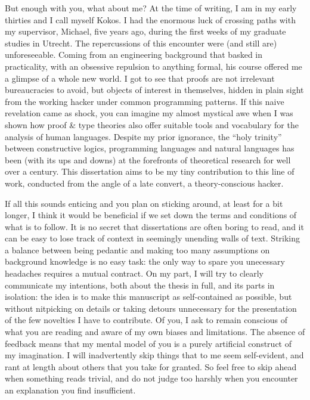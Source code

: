 {But enough with you, what about me? 
At the time of writing, I am in my early thirties and I call myself Kokos. 
I had the enormous luck of crossing paths with my supervisor, Michael, five years ago, during the first weeks of my graduate studies in Utrecht. 
The repercussions of this encounter were (and still are) unforeseeable. 
Coming from an engineering background that basked in practicality, with an obsessive repulsion to anything formal, his course offered me a glimpse of a whole new world. 
I got to see that proofs are not irrelevant bureaucracies to avoid, but objects of interest in themselves, hidden in plain sight from the working hacker under common programming patterns. 
If this naive revelation came as shock, you can imagine my almost mystical awe when I was shown how proof \& type theories also offer suitable tools and vocabulary for the analysis of human languages. 
Despite my prior ignorance, the “holy trinity” between constructive logics, programming languages and natural languages has been (with its ups and downs) at the forefronts of theoretical research for well over a century. 
This dissertation aims to be my tiny contribution to this line of work, conducted from the angle of a late convert, a theory-conscious hacker. 

If all this sounds enticing and you plan on sticking around, at least for a bit longer, I think it would be beneficial if we set down the terms and conditions of what is to follow. 
It is no secret that dissertations are often boring to read, and it can be easy to lose track of context in seemingly unending walls of text. 
Striking a balance between being pedantic and making too many assumptions on background knowledge is no easy task: the only way to spare you unecessary headaches requires a mutual contract. 
On my part, I will try to clearly communicate my intentions, both about the thesis in full, and its parts in isolation: the idea is to make this manuscript as self-contained as possible, but without nitpicking on details or taking detours unnecessary for the presentation of the few novelties I have to contribute.
Of you, I ask to remain conscious of what you are reading and aware of my own biases and limitations. 
The absence of feedback means that my mental model of you is a purely artificial construct of my imagination.
I will inadvertently skip things that to me seem self-evident, and rant at length about others that you take for granted.
So feel free to skip ahead when something reads trivial, and do not judge too harshly when you encounter an explanation you find insufficient.

}
